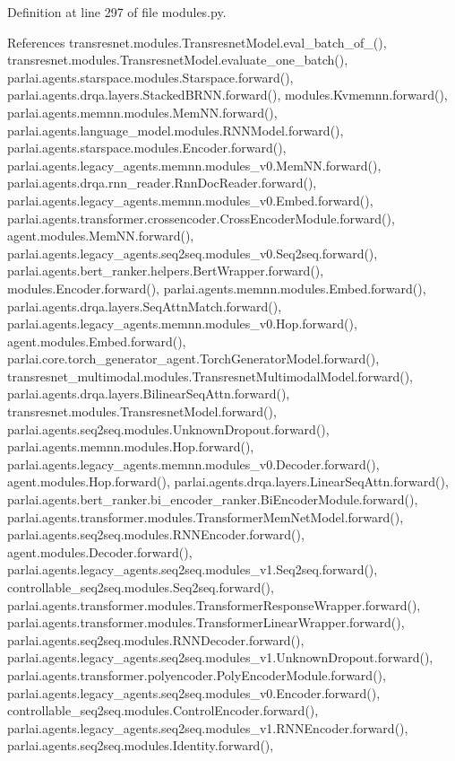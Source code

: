 Definition at line 297 of file modules.\+py.



References transresnet.\+modules.\+Transresnet\+Model.\+eval\+\_\+batch\+\_\+of\+\_(), transresnet.\+modules.\+Transresnet\+Model.\+evaluate\+\_\+one\+\_\+batch(), parlai.\+agents.\+starspace.\+modules.\+Starspace.\+forward(), parlai.\+agents.\+drqa.\+layers.\+Stacked\+B\+R\+N\+N.\+forward(), modules.\+Kvmemnn.\+forward(), parlai.\+agents.\+memnn.\+modules.\+Mem\+N\+N.\+forward(), parlai.\+agents.\+language\+\_\+model.\+modules.\+R\+N\+N\+Model.\+forward(), parlai.\+agents.\+starspace.\+modules.\+Encoder.\+forward(), parlai.\+agents.\+legacy\+\_\+agents.\+memnn.\+modules\+\_\+v0.\+Mem\+N\+N.\+forward(), parlai.\+agents.\+drqa.\+rnn\+\_\+reader.\+Rnn\+Doc\+Reader.\+forward(), parlai.\+agents.\+legacy\+\_\+agents.\+memnn.\+modules\+\_\+v0.\+Embed.\+forward(), parlai.\+agents.\+transformer.\+crossencoder.\+Cross\+Encoder\+Module.\+forward(), agent.\+modules.\+Mem\+N\+N.\+forward(), parlai.\+agents.\+legacy\+\_\+agents.\+seq2seq.\+modules\+\_\+v0.\+Seq2seq.\+forward(), parlai.\+agents.\+bert\+\_\+ranker.\+helpers.\+Bert\+Wrapper.\+forward(), modules.\+Encoder.\+forward(), parlai.\+agents.\+memnn.\+modules.\+Embed.\+forward(), parlai.\+agents.\+drqa.\+layers.\+Seq\+Attn\+Match.\+forward(), parlai.\+agents.\+legacy\+\_\+agents.\+memnn.\+modules\+\_\+v0.\+Hop.\+forward(), agent.\+modules.\+Embed.\+forward(), parlai.\+core.\+torch\+\_\+generator\+\_\+agent.\+Torch\+Generator\+Model.\+forward(), transresnet\+\_\+multimodal.\+modules.\+Transresnet\+Multimodal\+Model.\+forward(), parlai.\+agents.\+drqa.\+layers.\+Bilinear\+Seq\+Attn.\+forward(), transresnet.\+modules.\+Transresnet\+Model.\+forward(), parlai.\+agents.\+seq2seq.\+modules.\+Unknown\+Dropout.\+forward(), parlai.\+agents.\+memnn.\+modules.\+Hop.\+forward(), parlai.\+agents.\+legacy\+\_\+agents.\+memnn.\+modules\+\_\+v0.\+Decoder.\+forward(), agent.\+modules.\+Hop.\+forward(), parlai.\+agents.\+drqa.\+layers.\+Linear\+Seq\+Attn.\+forward(), parlai.\+agents.\+bert\+\_\+ranker.\+bi\+\_\+encoder\+\_\+ranker.\+Bi\+Encoder\+Module.\+forward(), parlai.\+agents.\+transformer.\+modules.\+Transformer\+Mem\+Net\+Model.\+forward(), parlai.\+agents.\+seq2seq.\+modules.\+R\+N\+N\+Encoder.\+forward(), agent.\+modules.\+Decoder.\+forward(), parlai.\+agents.\+legacy\+\_\+agents.\+seq2seq.\+modules\+\_\+v1.\+Seq2seq.\+forward(), controllable\+\_\+seq2seq.\+modules.\+Seq2seq.\+forward(), parlai.\+agents.\+transformer.\+modules.\+Transformer\+Response\+Wrapper.\+forward(), parlai.\+agents.\+transformer.\+modules.\+Transformer\+Linear\+Wrapper.\+forward(), parlai.\+agents.\+seq2seq.\+modules.\+R\+N\+N\+Decoder.\+forward(), parlai.\+agents.\+legacy\+\_\+agents.\+seq2seq.\+modules\+\_\+v1.\+Unknown\+Dropout.\+forward(), parlai.\+agents.\+transformer.\+polyencoder.\+Poly\+Encoder\+Module.\+forward(), parlai.\+agents.\+legacy\+\_\+agents.\+seq2seq.\+modules\+\_\+v0.\+Encoder.\+forward(), controllable\+\_\+seq2seq.\+modules.\+Control\+Encoder.\+forward(), parlai.\+agents.\+legacy\+\_\+agents.\+seq2seq.\+modules\+\_\+v1.\+R\+N\+N\+Encoder.\+forward(), parlai.\+agents.\+seq2seq.\+modules.\+Identity.\+forward(), 